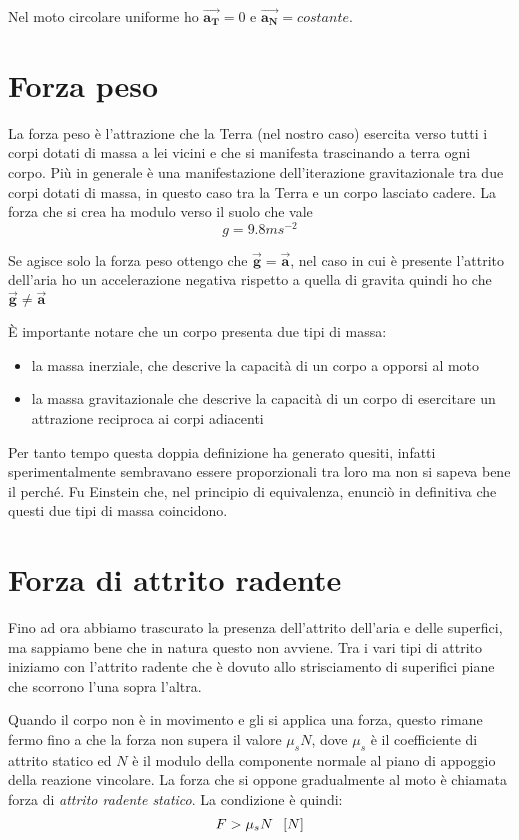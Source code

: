 \documentclass[class=book, crop=false, oneside, 12pt]{standalone}
\begin{document}
Nel moto circolare uniforme ho \(\overrightarrow{\mathbf{a_T}} = 0\) e \(\overrightarrow{\mathbf{a_N}} = costante\).

\section{Forza peso}

La forza peso è l'attrazione che la Terra (nel nostro caso) esercita verso tutti i corpi dotati di massa a lei vicini e che si manifesta trascinando a terra ogni corpo. 
Più in generale è una manifestazione dell'iterazione gravitazionale tra due corpi dotati di massa, in questo caso tra la Terra e un corpo lasciato cadere.
La forza che si crea ha modulo verso il suolo che vale 
\begin{equation}
    g = 9.8 ms^{-2}
\end{equation}

Se agisce solo la forza peso ottengo che \(\overrightarrow{\mathbf{g}} = \overrightarrow{\mathbf{a}}\), 
nel caso in cui è presente l'attrito dell'aria ho un accelerazione negativa rispetto a quella di gravita quindi ho che \(\overrightarrow{\mathbf{g}} \neq \overrightarrow{\mathbf{a}}\)

È importante notare che un corpo presenta due tipi di massa:
\begin{itemize}
    \item la massa inerziale, che descrive la capacità di un corpo a opporsi al moto
    \item la massa gravitazionale che descrive la capacità di un corpo di esercitare un attrazione reciproca ai corpi adiacenti
\end{itemize}
Per tanto tempo questa doppia definizione ha generato quesiti, infatti sperimentalmente sembravano essere proporzionali tra loro ma non si sapeva bene il perché.
Fu Einstein che, nel principio di equivalenza, enunciò in definitiva che questi due tipi di massa coincidono.

\section{Forza di attrito radente}

Fino ad ora abbiamo trascurato la presenza dell'attrito dell'aria e delle superfici, ma sappiamo bene che in natura questo non avviene.
Tra i vari tipi di attrito iniziamo con l'attrito radente che è dovuto allo strisciamento di superifici piane che scorrono l'una sopra l'altra.

Quando il corpo non è in movimento e gli si applica una forza, questo rimane fermo fino a che la forza non supera il valore \(\mu_s N\), 
dove \(\mu_s\) è il coefficiente di attrito statico ed \(N\) è il modulo della componente normale al piano di appoggio della reazione vincolare.
La forza che si oppone gradualmente al moto è chiamata forza di \emph{attrito radente statico}.
La condizione è quindi:
\begin{equation*}
    F > \mu_s N \hspace{0.2cm} \left[N\right]
\end{equation*}
\end{document}
